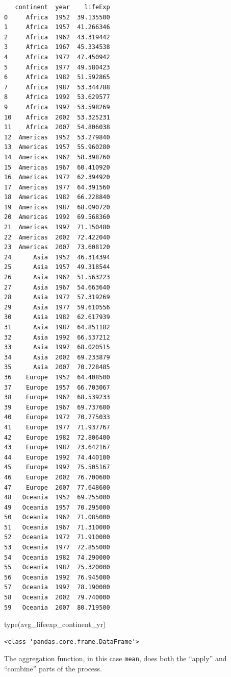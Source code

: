 \documentclass[
  letterpaper,
]{scrbook}
\newenvironment{Shaded}{\begin{snugshade}}{\end{snugshade}}
\newcommand{\BuiltInTok}[1]{#1}
\newcommand{\NormalTok}[1]{#1}
\begin{document}
\begin{verbatim}
   continent  year    lifeExp
0     Africa  1952  39.135500
1     Africa  1957  41.266346
2     Africa  1962  43.319442
3     Africa  1967  45.334538
4     Africa  1972  47.450942
5     Africa  1977  49.580423
6     Africa  1982  51.592865
7     Africa  1987  53.344788
8     Africa  1992  53.629577
9     Africa  1997  53.598269
10    Africa  2002  53.325231
11    Africa  2007  54.806038
12  Americas  1952  53.279840
13  Americas  1957  55.960280
14  Americas  1962  58.398760
15  Americas  1967  60.410920
16  Americas  1972  62.394920
17  Americas  1977  64.391560
18  Americas  1982  66.228840
19  Americas  1987  68.090720
20  Americas  1992  69.568360
21  Americas  1997  71.150480
22  Americas  2002  72.422040
23  Americas  2007  73.608120
24      Asia  1952  46.314394
25      Asia  1957  49.318544
26      Asia  1962  51.563223
27      Asia  1967  54.663640
28      Asia  1972  57.319269
29      Asia  1977  59.610556
30      Asia  1982  62.617939
31      Asia  1987  64.851182
32      Asia  1992  66.537212
33      Asia  1997  68.020515
34      Asia  2002  69.233879
35      Asia  2007  70.728485
36    Europe  1952  64.408500
37    Europe  1957  66.703067
38    Europe  1962  68.539233
39    Europe  1967  69.737600
40    Europe  1972  70.775033
41    Europe  1977  71.937767
42    Europe  1982  72.806400
43    Europe  1987  73.642167
44    Europe  1992  74.440100
45    Europe  1997  75.505167
46    Europe  2002  76.700600
47    Europe  2007  77.648600
48   Oceania  1952  69.255000
49   Oceania  1957  70.295000
50   Oceania  1962  71.085000
51   Oceania  1967  71.310000
52   Oceania  1972  71.910000
53   Oceania  1977  72.855000
54   Oceania  1982  74.290000
55   Oceania  1987  75.320000
56   Oceania  1992  76.945000
57   Oceania  1997  78.190000
58   Oceania  2002  79.740000
59   Oceania  2007  80.719500
\end{verbatim}

\begin{Shaded}
\begin{Highlighting}[]
\BuiltInTok{type}\NormalTok{(avg_lifeexp_continent_yr)}
\end{Highlighting}
\end{Shaded}

\begin{verbatim}
<class 'pandas.core.frame.DataFrame'>
\end{verbatim}

The aggregation function, in this case \texttt{mean}, does both the ``apply'' and ``combine'' parts of the process.
\end{document}
